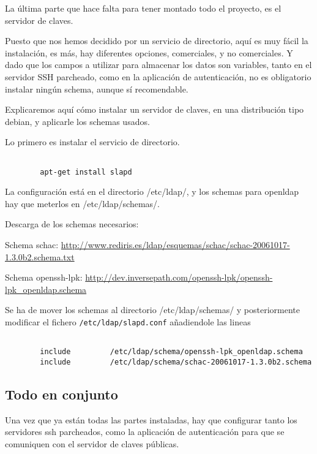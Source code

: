        La última parte que hace falta para tener montado todo el
        proyecto, es el servidor de claves.

        Puesto que nos hemos decidido por un servicio de directorio,
        aquí es muy fácil la instalación, es más, hay diferentes
        opciones, comerciales, y no comerciales. Y dado que los
        campos a utilizar para almacenar los datos son variables,
        tanto en el servidor SSH parcheado, como en la aplicación de
        autenticación, no es obligatorio instalar ningún schema,
        aunque sí recomendable.

        Explicaremos aquí cómo instalar un servidor de claves, en una
        distribución tipo debian, y aplicarle los schemas usados.

        Lo primero es instalar el servicio de directorio.

        \begin{verbatim}

        apt-get install slapd

        \end{verbatim}

        La configuración está en el directorio /etc/ldap/, y los
        schemas para openldap hay que meterlos en /etc/ldap/schemas/.

        Descarga de los schemas necesarios:

        Schema schac: 
        \url{http://www.rediris.es/ldap/esquemas/schac/schac-20061017-1.3.0b2.schema.txt}

        Schema openssh-lpk:
        \url{http://dev.inversepath.com/openssh-lpk/openssh-lpk\_openldap.schema}


        Se ha de mover los schemas al directorio /etc/ldap/schemas/ y
        posteriormente modificar el fichero
        \texttt{/etc/ldap/slapd.conf} añadiendole las lineas

        \begin{verbatim}

        include         /etc/ldap/schema/openssh-lpk_openldap.schema
        include         /etc/ldap/schema/schac-20061017-1.3.0b2.schema

        \end{verbatim}

        
        \subsection{Todo en conjunto}

        Una vez que ya están todas las partes instaladas, hay que
        configurar tanto los servidores ssh parcheados, como la
        aplicación de autenticación para que se comuniquen con el
        servidor de claves públicas.

